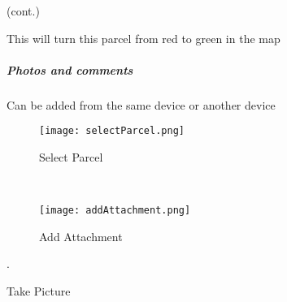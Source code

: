  {\footnotesize (cont.)}
 \vspace{.5in}

 \vspace{4in} 
 

\noindent This will turn this parcel from red to green in the map

 \clearpage
 \subparagraph*{Photos and comments}
 
 \noindent Can be added from the same device or another device

 \begin{wrapfigure}{r}{0.6\textwidth}
 \centering
     \texttt{[image: selectParcel.png]}
 \caption {Select Parcel}
 \vspace{.05in}

 \HRule \\[.4cm] %
 \vspace{.1in}

     \texttt{[image: addAttachment.png]}
 \caption{Add Attachment}
 \vspace{.05in}

 \end{wrapfigure}

 .

 \vspace{.5in}

\vspace{1.5in} 
 
 \vspace{2in}

 
 \vspace{.25in}
 

\vspace{.25in}


\vspace{.2in}

\noindent Take Picture

\vspace{.25in}

